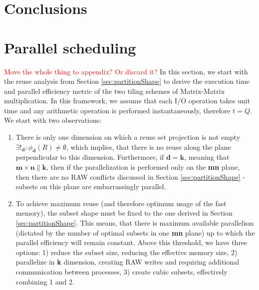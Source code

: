 \documentclass[sigconf]{acmart}
\newcommand\todo[1]{\textcolor{red}{#1}}
\begin{document}
\section{Conclusions}

%




\appendix
\section{Parallel scheduling}
\todo{Move the whole thing to appendix? Or discard it?}
In this section, we start with the reuse analysis from Section 
\ref{sec:partitionShape} 
to derive the execution time and parallel efficiency metric of the two tiling 
schemes of Matrix-Matrix multiplication. In this framework, we assume that each 
I/O operation takes unit time and any arithmetic operation is performed 
instantaneously, therefore $t = Q$. We start with two observations:

\begin{enumerate}
	\item There is only one dimension on 
	which a reuse set projection is not empty $\exists!_{\mathbf{d}}: 
	\phi_{\mathbf{d}}(R) \ne 
	\emptyset$, which implies, that there is no reuse along the plane 
	perpendicular 
	to this dimension. Furthermore, if $\mathbf{d} = \mathbf{k}$, meaning that 
	$\mathbf{m} \times \mathbf{n} \parallel \mathbf{k}$, then if the 
	parallelization is performed only on the \textbf{mn} plane, then there are 
	no RAW 
	conflicts discussed in Section \ref{sec:partitionShape} - subsets on 
	this 
	plane are embarrassingly parallel. 
	\item To achieve maximum reuse (and therefore optimum usage 
	of the fast memory), the subset shape must be fixed to the one derived 
	in 
	Section \ref{sec:partitionShape}. This means, that there is maximum 
	available 
	parallelism (dictated by the number of optimal subsets in one  
	\textbf{mn} plane) up to which the parallel efficiency will remain 
	constant. Above this threshold, we have three options: 1) reduce the 
	subset size, reducing the effective memory size, 2) parallelize in 
	\textbf{k} dimension, creating RAW writes and requiring additional 
	communication between processes, 3) create cubic subsets, effectively 
	combining 1 and 2.
\end{enumerate}
\end{document}
